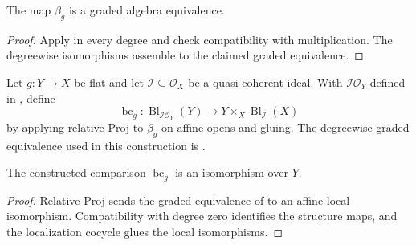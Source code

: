 \begin{lemma}
  \label{lemma:nagata-flat-pullback-rees}

  The map $\beta_g$ is a graded algebra equivalence.
\end{lemma}

\begin{proof}
  Apply  in every degree and check
  compatibility with multiplication.  The degreewise isomorphisms assemble
  to the claimed graded equivalence.
\end{proof}

\begin{definition}
  \label{def:nagata-blowup-flat-base-change-map}

  Let $g\colon Y\to X$ be flat and let
  $\mathcal I\subseteq\mathcal O_X$ be a quasi-coherent ideal.  With
  $\mathcal I\mathcal O_Y$ defined in
  , define
  \[
    \operatorname{bc}_g\colon
    \operatorname{Bl}_{\mathcal I\mathcal O_Y}(Y)
      \longrightarrow
    Y\times_X\operatorname{Bl}_{\mathcal I}(X)
  \]
  by applying relative Proj to $\beta_g$ on affine opens and gluing.  The
  degreewise graded equivalence used in this construction is
  .
\end{definition}

\begin{theorem}
  \label{thm:nagata-blowup-flat-base-change}

  The constructed comparison $\operatorname{bc}_g$ is an isomorphism over
  $Y$.
\end{theorem}

\begin{proof}
  Relative Proj sends the graded equivalence of
   to an affine-local isomorphism.
  Compatibility with degree zero identifies the structure maps, and the
  localization cocycle glues the local isomorphisms.
\end{proof}

